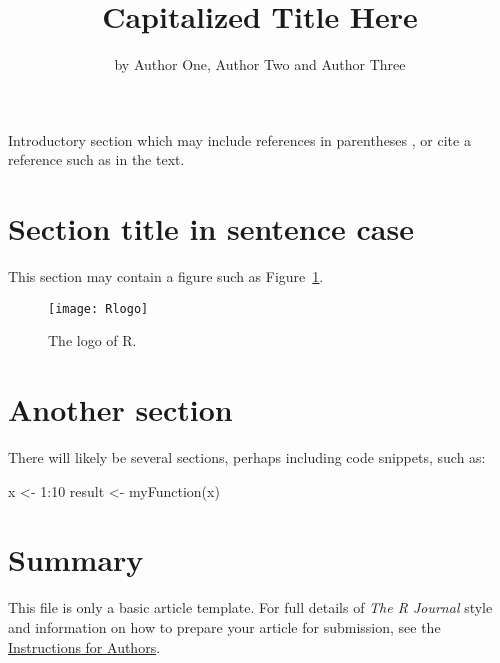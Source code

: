 \title{Capitalized Title Here}
\author{by Author One, Author Two and Author Three}

\maketitle


Introductory section which may include references in parentheses
\citep{R}, or cite a reference such as \citet{R} in the text.

\section{Section title in sentence case}

This section may contain a figure such as Figure~\ref{figure:rlogo}.

\begin{figure}[htbp]
  \centering
  \texttt{[image: Rlogo]}
  \caption{The logo of R.}
  \label{figure:rlogo}
\end{figure}

\section{Another section}

There will likely be several sections, perhaps including code snippets, such as:

\begin{example}
  x <- 1:10
  result <- myFunction(x)
\end{example}

\section{Summary}

This file is only a basic article template. For full details of \emph{The R Journal} style and information on how to prepare your article for submission, see the \href{http://journal.r-project.org/latex/RJauthorguide.pdf}{Instructions for Authors}.



\address{Author One\\
  Affiliation\\
  Address\\
  Country\\}

\address{Author Two\\
  Affiliation\\
  Address\\
  Country\\}

\address{Author Three\\
  Affiliation\\
  Address\\
  Country\\}
